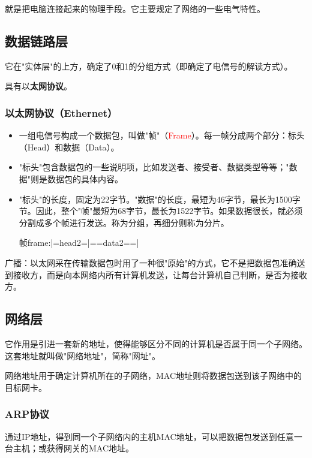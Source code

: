 \documentclass[UTF8]{article}%
\begin{document}
就是把电脑连接起来的物理手段。它主要规定了网络的一些电气特性。

\subsection{数据链路层}

它在"实体层"的上方，确定了0和1的分组方式（即确定了电信号的解读方式）。

具有以\textbf{太网协议}。

\subsubsection{以太网协议（Ethernet）}

\begin{itemize}
    \item 一组电信号构成一个数据包，叫做"帧"（\textcolor{red}{Frame}）。每一帧分成两个部分：标头（Head）和数据（Data）。
    \item "标头"包含数据包的一些说明项，比如发送者、接受者、数据类型等等；"数据"则是数据包的具体内容。
    \item "标头"的长度，固定为22字节。"数据"的长度，最短为46字节，最长为1500字节。因此，整个"帧"最短为68字节，最长为1522字节。如果数据很长，就必须分割成多个帧进行发送。称为分组，再细分则称为分片。
    
    帧frame:|=head2=|==data2==|

\end{itemize}

广播：以太网采在传输数据包时用了一种很"原始"的方式，它不是把数据包准确送到接收方，而是向本网络内所有计算机发送，让每台计算机自己判断，是否为接收方。

\subsection{网络层}

它作用是引进一套新的地址，使得能够区分不同的计算机是否属于同一个子网络。这套地址就叫做"网络地址"，简称"网址"。

网络地址用于确定计算机所在的子网络，MAC地址则将数据包送到该子网络中的目标网卡。

\subsubsection{ARP协议}

通过IP地址，得到同一个子网络内的主机MAC地址，可以把数据包发送到任意一台主机；或获得网关的MAC地址。
\end{document}
